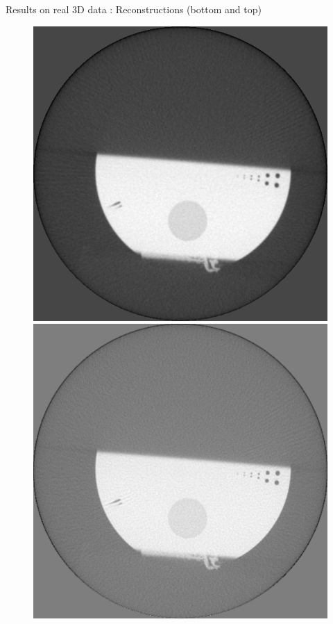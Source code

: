 \documentclass[latex]{beamer}
\begin{document}
\begin{frame}{}
\begin{block}{Results on real 3D data : Reconstructions (bottom and top)}
\begin{figure}
\begin{minipage}[htb]{0.30\linewidth}
\centering
\includegraphics[scale=0.19]{volume_FDKProj300Bas.png}
\end{minipage} \hfill
\begin{minipage}[htb]{0.30\linewidth}
\centering
\includegraphics[scale=0.19]{volumeIQI_TVProj300Bas.png}

\end{minipage}
\end{figure}
\end{block}
\end{frame}
\end{document}
